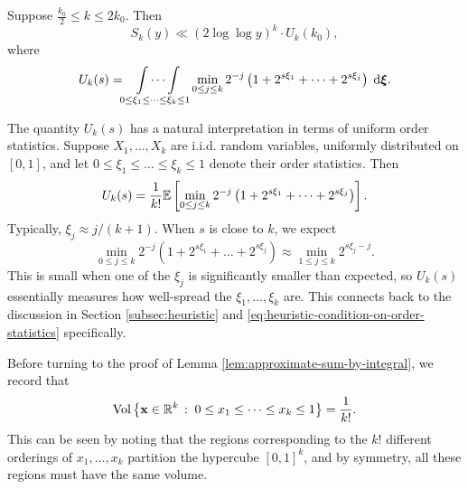 \begin{lemma} \label{lem:approximate-sum-by-integral}
    Suppose $\frac{k_0}{2} \le k \le 2k_0$. 
    Then 
    \begin{equation*}
        S_k(y) \ll (2 \log \log y)^k \cdot U_k(k_0),
    \end{equation*}
    where 
    \begin{equation*}
        U_k(s) = \idotsint \limits_{0 \le \xi_1 \le \dots \le \xi_k\le 1} \min \limits_{0 \le j \le k} 2^{-j} \left( 1 + 2^{s\xi_1} + \dots + 2^{s \xi_j} \right) \; \mathrm{d} \bm{\xi}.
    \end{equation*}
\end{lemma}

\begin{remark}
    The quantity $U_k(s)$ has a natural interpretation in terms of uniform order statistics. 
    Suppose $X_1, \dots, X_k$ are i.i.d. random variables, uniformly distributed on $[0, 1]$, and let $0 \le \xi_1 \le \dots \le \xi_k \le 1$ denote their order statistics.
    Then 
    \begin{equation*}
        U_k(s) = \frac{1}{k!}\mathbb{E}\left[\min \limits_{0 \le j \le k} 2^{-j}\left( 1 + 2^{s\xi_1} + \dots + 2^{s \xi_j} \right)\right].
    \end{equation*}
    Typically, $\xi_j \approx j/(k + 1)$. 
    When $s$ is close to $k$, we expect
    \begin{equation*}
        \min_{0 \le j \le k} 2^{-j}\left( 1 + 2^{s\xi_1} + \dots + 2^{s \xi_j} \right) \approx \min_{1 \le j \le k} 2^{s\xi_j - j}.
    \end{equation*}
    This is small when one of the $\xi_j$ is significantly smaller than expected, so $U_k(s)$ essentially measures how well-spread the $\xi_1, \dots, \xi_k$ are. 
    This connects back to the discussion in Section \ref{subsec:heuristic} and \eqref{eq:heuristic-condition-on-order-statistics} specifically.
\end{remark}

Before turning to the proof of Lemma \ref{lem:approximate-sum-by-integral}, we record that
\begin{equation} \label{eq:volume-of-ordering}
    \mathrm{Vol} \left\{\mathbf{x} \in \mathbb{R}^k\,:\;0 \le x_1 \le \dots \le x_k \le 1\right\} = \frac{1}{k!}.
\end{equation}
This can be seen by noting that the regions corresponding to the $k!$ different orderings of $x_1, \dots, x_k$ partition the hypercube $[0, 1]^k$, and by symmetry, all these regions must have the same volume.

